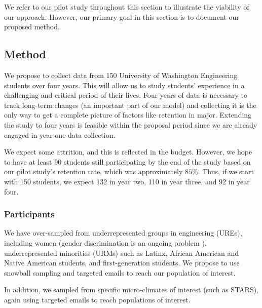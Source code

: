 We refer to our pilot study throughout this section to illustrate the viability of our approach. However, our primary goal in this section is to document our proposed method. 

\subsection{Method}
\noindent
We propose to collect data from 150  University of Washington Engineering students over four years. This will allow us to study students' experience in a challenging and critical period of their lives. Four years of data is necessary to track long-term changes (an important part of our model) and collecting it is the only way to get a complete picture of factors like retention in major.
Extending the study to four years is feasible within the proposal period  since we are already engaged in year-one data collection.

We expect some attrition, and this is reflected in the budget. However, we hope to have at least 90 students still participating by the end of the study based on our pilot study's retention rate, which was approximately $85\%$. Thus, if we start with 150 students, we expect 132 in year two, 110 in year three, and 92 in year four. 


\subsubsection{Participants}
\label{sec:study-participants}
We have over-sampled from underrepresented groups in engineering (UREs), including women (gender discrimination is an ongoing problem \cite{johnson2018sexual}), underrepresented minorities (URMs) such as Latinx, African American and Native American students, and first-generation students.  We propose to use snowball sampling and targeted emails to reach our population of interest. 

In addition, we sampled from specific micro-climates of interest (such as STARS), again using targeted emails to reach populations of interest.

